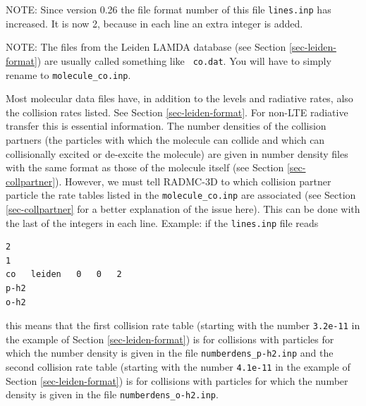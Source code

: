 \documentclass{report}
\newenvironment{asciibox}%
  {\begin{list}{}{%
    \setlength{\topsep}{0.5em}%
    \setlength{\parskip}{0em}%
    \setlength{\parsep}{0em}%
    \setlength{\itemsep}{0em}%
    \setlength{\rightmargin}{0em}%
    \setlength{\leftmargin}{3.0em}%
    \setlength{\labelsep}{1em}%
    \setlength{\labelwidth}{2em}%
  }\normalfont\footnotesize\item}
  {\end{list}}
\begin{document}
NOTE: Since version 0.26 the file format number of this file {\small\tt lines.inp}
has increased. It is now 2, because in each line an extra integer is added.

NOTE: The files from the Leiden LAMDA database (see Section
\ref{sec-leiden-format}) are usually called something like {\small\tt
  co.dat}. You will have to simply rename to {\small\tt molecule\_co.inp}.

Most molecular data files have, in addition to the levels and radiative
rates, also the collision rates listed. See Section \ref{sec-leiden-format}.
For non-LTE radiative transfer this is essential information. The number
densities of the collision partners (the particles with which the molecule
can collide and which can collisionally excited or de-excite the molecule)
are given in number density files with the same format as those of the
molecule itself (see Section \ref{sec-collpartner}). However, we must tell
RADMC-3D to which collision partner particle the rate tables listed in the
{\small\tt molecule\_co.inp} are associated (see Section
\ref{sec-collpartner} for a better explanation of the issue here). This can
be done with the last of the integers in each line. Example: if the
{\small\tt lines.inp} file reads
\begin{asciibox}\begin{verbatim}
2
1
co   leiden   0   0   2
p-h2
o-h2
\end{verbatim}\end{asciibox}
this means that the first collision rate table (starting with the number
{\small\tt 3.2e-11} in the example of Section \ref{sec-leiden-format}) is
for collisions with particles for which the number density is given in the
file {\small\tt numberdens\_p-h2.inp} and the second collision rate table
(starting with the number {\small\tt 4.1e-11} in the example of Section
\ref{sec-leiden-format}) is for collisions with particles for which the
number density is given in the file {\small\tt numberdens\_o-h2.inp}.
\end{document}
